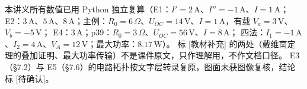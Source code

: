 \documentclass[11pt]{ctexart}
\begin{document}
\flowerrule

{\small\color{inkgray}
本讲义所有数值已用 Python 独立复算（E1：$I'=2\,\mathrm{A}$、$I''=-1\,\mathrm{A}$、$I=1\,\mathrm{A}$；
E2：$3\,\mathrm{A}$、$5\,\mathrm{A}$、$8\,\mathrm{A}$；主例：$R_0=6\,\Omega$、$U_{OC}=14\,\mathrm{V}$、$I=1\,\mathrm{A}$，有载 $V_a=3\,\mathrm{V}$、$V_b=-5\,\mathrm{V}$；
E4：$3\,\mathrm{A}$；p39：$R_0=3\,\Omega$、$U_{OC}=56\,\mathrm{V}$、$I=8\,\mathrm{A}$；
四法：$I_1=-1\,\mathrm{A}$、$I_2=4\,\mathrm{A}$、$V_A=12\,\mathrm{V}$；最大功率：$8.17\,\mathrm{W}$）。
标 [教材补充] 的两处（戴维南定理的叠加证明、最大功率传输）不是课件原文，只作理解用，不作文档口径。
E3（§7.2）与 E5（§7.6）的电路拓扑按文字层转录复原，图面未获图像复核，结论标 [待确认]。}
\end{document}
